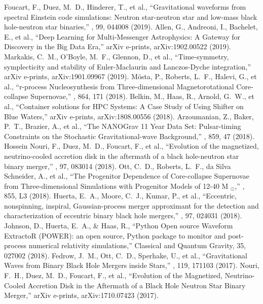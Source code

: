  Foucart, F., Duez, M.~D., Hinderer, T., et al., ``Gravitational waveforms from spectral Einstein code simulations: Neutron star-neutron star and low-mass black hole-neutron star binaries,'' \prd, 99, 044008 (2019).
 Allen, G., Andreoni, I., Bachelet, E., et al., ``Deep Learning for Multi-Messenger Astrophysics: A Gateway for Discovery in the Big Data Era,'' arXiv e-prints, arXiv:1902.00522 (2019).
 Markakis, C.~M., O'Boyle, M.~F., Glennon, D., et al., ``Time-symmetry, symplecticity and stability of Euler-Maclaurin and Lanczos-Dyche integration,'' arXiv e-prints, arXiv:1901.09967 (2019).
 M{\"o}sta, P., Roberts, L.~F., Halevi, G., et al., ``r-process Nucleosynthesis from Three-dimensional Magnetorotational Core-collapse Supernovae,'' \apj, 864, 171 (2018).
 Belkin, M., Haas, R., Arnold, G.~W., et al., ``Container solutions for HPC Systems: A Case Study of Using Shifter on Blue Waters,'' arXiv e-prints, arXiv:1808.00556 (2018).
 Arzoumanian, Z., Baker, P.~T., Brazier, A., et al., ``The NANOGrav 11 Year Data Set: Pulsar-timing Constraints on the Stochastic Gravitational-wave Background,'' \apj, 859, 47 (2018).
 Hossein Nouri, F., Duez, M.~D., Foucart, F., et al., ``Evolution of the magnetized, neutrino-cooled accretion disk in the aftermath of a black hole-neutron star binary merger,'' \prd, 97, 083014 (2018).
 Ott, C.~D., Roberts, L.~F., da Silva Schneider, A., et al., ``The Progenitor Dependence of Core-collapse Supernovae from Three-dimensional Simulations with Progenitor Models of 12-40 M $_{{\ensuremath{\odot}}}$,'' \apjl, 855, L3 (2018).
 Huerta, E.~A., Moore, C.~J., Kumar, P., et al., ``Eccentric, nonspinning, inspiral, Gaussian-process merger approximant for the detection and characterization of eccentric binary black hole mergers,'' \prd, 97, 024031 (2018).
 Johnson, D., Huerta, E.~A., \& Haas, R., ``Python Open source Waveform ExtractoR (POWER): an open source, Python package to monitor and post-process numerical relativity simulations,'' Classical and Quantum Gravity, 35, 027002 (2018).
 Fedrow, J.~M., Ott, C.~D., Sperhake, U., et al., ``Gravitational Waves from Binary Black Hole Mergers inside Stars,'' \prl, 119, 171103 (2017).
 Nouri, F.~H., Duez, M.~D., Foucart, F., et al., ``Evolution of the Magnetized, Neutrino-Cooled Accretion Disk in the Aftermath of a Black Hole Neutron Star Binary Merger,'' arXiv e-prints, arXiv:1710.07423 (2017).
